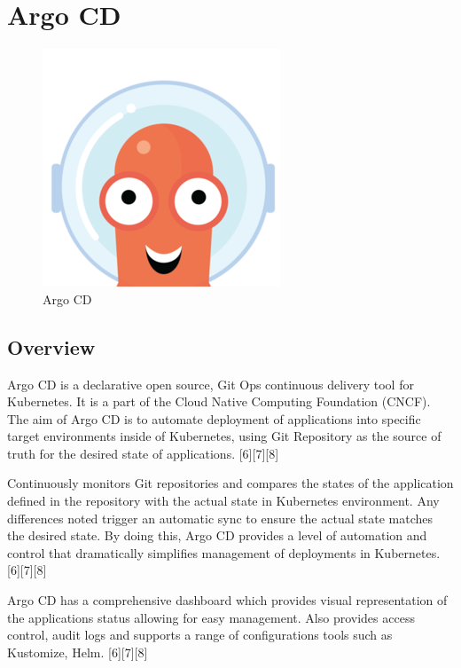 \documentclass[conference]{IEEEtran}
\begin{document}
\section{Argo CD}

\begin{figure}[htbp]
    \centering
    \includegraphics[width=0.35\linewidth]{ArgoCDImage.png}
    \caption{Argo CD}
    \label{fig:argo-cd}
\end{figure}

\subsection{Overview}
Argo CD is a declarative open source, Git Ops continuous delivery tool for Kubernetes. It is a part of the Cloud Native Computing Foundation (CNCF). The aim of Argo CD is to automate deployment of applications into specific target environments inside of Kubernetes, using Git Repository as the source of truth for the desired state of applications. [6][7][8]

Continuously monitors Git repositories and compares the states of the application defined in the repository with the actual state in Kubernetes environment. Any differences noted trigger an automatic sync to ensure the actual state matches the desired state. By doing this, Argo CD provides a level of automation and control that dramatically simplifies management of deployments in Kubernetes. [6][7][8] 

Argo CD has a comprehensive dashboard which provides visual representation of the applications status allowing for easy management. Also provides access control, audit logs and supports a range of configurations tools such as Kustomize, Helm. [6][7][8] 
\end{document}
